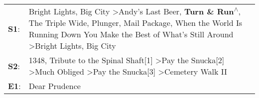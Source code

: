 \begin{supertabular}{p{0.03\textwidth}p{0.92\textwidth}}
 \textbf{S1}:  &  Bright Lights, Big City\textsuperscript{} \textgreater \enspace Andy's Last Beer\textsuperscript{}, \enspace \textbf{Turn \& Run\textsuperscript{$\wedge$}}, \enspace The Triple Wide\textsuperscript{}, \enspace Plunger\textsuperscript{}, \enspace Mail Package\textsuperscript{}, \enspace When the World Is Running Down You Make the Best of What's Still Around\textsuperscript{} \textgreater \enspace Bright Lights, Big City\textsuperscript{}  \enspace  \\
 \textbf{S2}:  &                                                                                                                                       1348\textsuperscript{}, \enspace Tribute to the Spinal Shaft[1]\textsuperscript{} \textgreater \enspace Pay the Snucka[2]\textsuperscript{} \textgreater \enspace Much Obliged\textsuperscript{} \textgreater \enspace Pay the Snucka[3]\textsuperscript{} \textgreater \enspace Cemetery Walk II\textsuperscript{}  \enspace  \\
 \textbf{E1}:  &                                                                                                                                                                                                                                                                                                                                                                                                                           Dear Prudence\textsuperscript{}  \enspace  \\
\end{supertabular}
